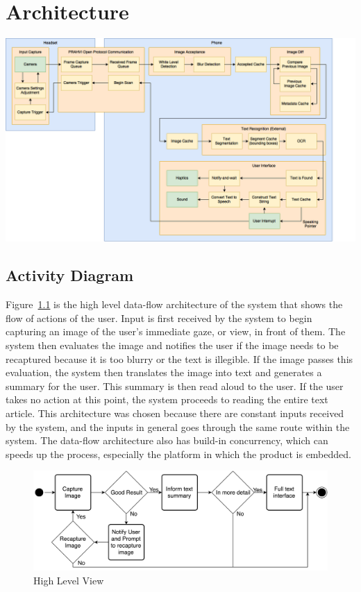 \chapter{Architecture}

\includegraphics[scale = 0.4]{PRAHVI-Block.png}

\section{Activity Diagram}
Figure~\ref{activityDiagram} is the high level data-flow architecture of the system that shows the flow of actions of the user. Input is first received by the system to begin capturing an image of the user's immediate gaze, or view, in front of them. The system then evaluates the image and notifies the user if the image needs to be recaptured because it is too blurry or the text is illegible. If the image passes this evaluation, the system then translates the image into text and generates a summary for the user. This summary is then read aloud to the user. If the user takes no action at this point, the system proceeds to reading the entire text article. This architecture was chosen because there are constant inputs received by the system, and the inputs in general goes through the same route within the system. The data-flow architecture also has build-in concurrency, which can speeds up the process, especially the platform in which the product is embedded.

\begin{figure}
	\centering
    \includegraphics[scale = 0.105]{Activity_H.png}%
    
    \caption{High Level View}
	\label{activityDiagram}
\end{figure}

